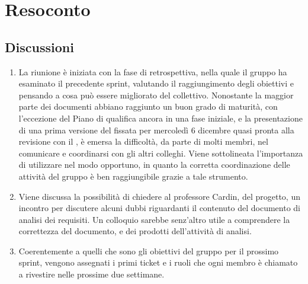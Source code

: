 \section{Resoconto} \label{sec:resoconto}
\subsection{Discussioni} \label{subsec:resdiscussione}
\begin{enumerate}
    \item La riunione è iniziata con la fase di retrospettiva, nella quale il gruppo ha esaminato il precedente sprint, valutando il raggiungimento degli obiettivi e pensando a cosa può essere migliorato del  collettivo. Nonostante la maggior parte  dei documenti abbiano raggiunto un buon grado di maturità, con l'eccezione del Piano di qualifica ancora in una fase iniziale, e la presentazione di una prima versione del  fissata per mercoledì 6 dicembre quasi pronta alla revisione con il , è emersa la difficoltà, da parte di molti membri, nel comunicare e coordinarsi con gli altri colleghi. Viene sottolineata l'importanza di utilizzare  nel modo opportuno,  in quanto la corretta coordinazione delle attività del gruppo è ben raggiungibile grazie a tale strumento.
    \item Viene discussa la possibilità di chiedere al professore Cardin,  del progetto, un incontro per discutere alcuni dubbi riguardanti il contenuto del documento di analisi dei requisiti. Un colloquio sarebbe senz'altro utile a comprendere la correttezza del documento, e dei prodotti dell'attività di analisi.
    \item Coerentemente a quelli che sono gli obiettivi del gruppo per il prossimo sprint, vengono assegnati i primi ticket e i ruoli che ogni membro è chiamato a rivestire nelle prossime due settimane.
\end{enumerate}

